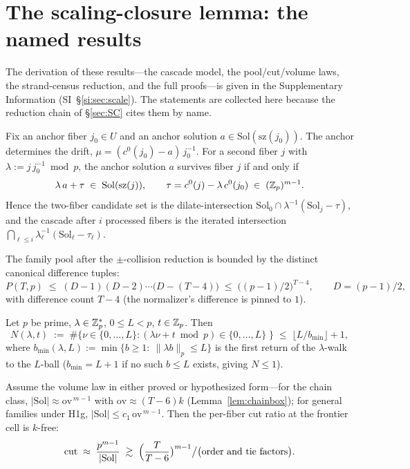 \section{The scaling-closure lemma: the named results}\label{sec:scale}

The derivation of these results---the cascade model, the pool/cut/volume laws,
the strand-census reduction, and the full proofs---is given in the Supplementary
Information (SI~\S\ref{si:sec:scale}). The statements are collected here because
the reduction chain of \S\ref{sec:SC} cites them by name.

\begin{lemma}\label{lem:twofiber}
Fix an anchor fiber $j_0\in U$ and an anchor solution
$a\in\mathrm{Sol}(\mathrm{sz}(j_0))$. The anchor determines the drift,
$\mu=(c^0(j_0)-a)\,j_0^{-1}$. For a second fiber $j$ with
$\lambda:=j\,j_0^{-1}\bmod p$, the anchor solution $a$ survives fiber
$j$ if and only if
\[
\lambda\,a+\tau\;\in\;\mathrm{Sol}(\mathrm{sz}(j)),
\qquad
\tau=c^0(j)-\lambda\,c^0(j_0)\;\in\;(\mathbb{Z}_p)^{m-1}.
\]
Hence the two-fiber candidate set is the dilate-intersection
$\mathrm{Sol}_0\cap\lambda^{-1}(\mathrm{Sol}_j-\tau)$, and the cascade
after $i$ processed fibers is the iterated intersection
$\bigcap_{\ell\le i}\lambda_\ell^{-1}(\mathrm{Sol}_\ell-\tau_\ell)$.
\end{lemma}

\begin{lemma}\label{lem:pool}
The family pool after the $\pm$-collision reduction is bounded by the
distinct canonical difference tuples:
\[
P(T,p)\;\le\;(D-1)(D-2)\cdots\bigl(D-(T-4)\bigr)
\;\le\;\bigl((p-1)/2\bigr)^{T-4},
\qquad D=(p-1)/2,
\]
with difference count $T-4$ (the normalizer's difference is pinned to
$1$).
\end{lemma}

\begin{lemma}\label{lem:spacing}
Let $p$ be prime, $\lambda\in\mathbb{Z}_p^*$, $0\le L<p$, $t\in\mathbb{Z}_p$. Then
\[
N(\lambda,t)\;:=\;\#\{\nu\in\{0,\dots,L\}:
(\lambda\nu+t\bmod p)\in\{0,\dots,L\}\;\}
\;\le\;\lfloor L/b_{\min}\rfloor+1,
\]
where $b_{\min}(\lambda,L):=\min\{b\ge 1:\ \|\lambda b\|_p\le L\}$ is
the first return of the $\lambda$-walk to the $L$-ball ($b_{\min}=L+1$
if no such $b\le L$ exists, giving $N\le 1$).
\end{lemma}

\begin{proposition}[$k$-cancellation]\label{prop:kcanc}
Assume the volume law in either proved or hypothesized form---for the
chain class, $|\mathrm{Sol}|\approx\mathrm{ov}^{\,m-1}$ with
$\mathrm{ov}\approx(T-6)k$ (Lemma~\ref{lem:chainbox}); for general
families under H1g, $|\mathrm{Sol}|\le c_1\,\mathrm{ov}^{\,m-1}$. Then
the per-fiber cut ratio at the frontier cell is $k$-free:
\[
\mathrm{cut}\;\approx\;\frac{p^{m-1}}{|\mathrm{Sol}|}
\;\gtrsim\;\Bigl(\frac{T}{T-6}\bigr)^{m-1}\big/\bigl(\text{order and
tie factors}\bigr).
\]
\end{proposition}

